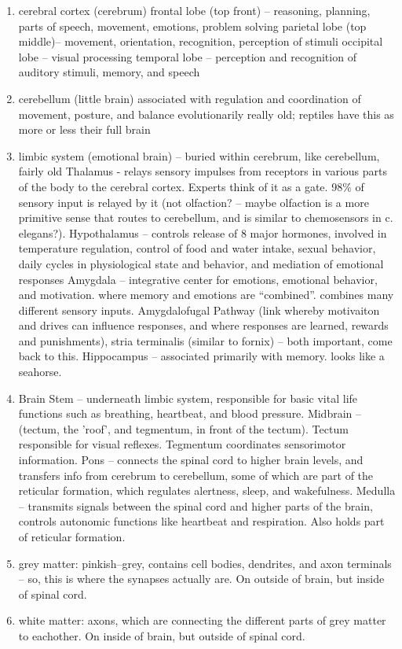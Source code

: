 \documentclass[11pt, a4paper, oneside]{article}   	%
\begin{document}
\begin{enumerate}
    \item cerebral cortex (cerebrum)
        \subitem frontal lobe (top front) -- reasoning, planning, parts of speech, movement, emotions, problem solving
        \subitem parietal lobe (top middle)-- movement,  orientation, recognition, perception of stimuli
        \subitem occipital lobe -- visual processing
        \subitem temporal lobe -- perception and recognition of auditory stimuli, memory, and speech
    \item cerebellum (little brain)
        \subitem associated with regulation and coordination of movement, posture, and balance
        \subitem evolutionarily really old; reptiles have this as more or less their full brain
    \item limbic system (emotional brain) -- buried within cerebrum, like cerebellum, fairly old
      \subitem Thalamus - relays sensory impulses from receptors in various parts of the body to the cerebral cortex. Experts think of it as a gate. 98\% of sensory input is relayed by it (not olfaction? -- maybe olfaction is a more primitive sense that routes to cerebellum, and is similar to chemosensors in c. elegans?).
      \subitem Hypothalamus  -- controls release of 8 major hormones, involved in temperature regulation, control of food and water intake,  sexual behavior,  daily cycles in physiological state and behavior, and mediation of emotional responses
      \subitem Amygdala -- integrative center for emotions, emotional behavior, and motivation.  where memory and emotions are ``combined''. combines many different sensory inputs.
        \subsubitem Amygdalofugal Pathway (link whereby motivaiton and drives can influence responses, and where responses are learned, rewards and punishments), stria terminalis (similar to fornix) -- both important, come back to this.
      \subitem Hippocampus -- associated primarily with memory. looks like a seahorse. 
    \item Brain Stem -- underneath limbic system, responsible for basic vital life functions such as breathing, heartbeat, and blood pressure.
        \subitem Midbrain -- (tectum, the 'roof', and tegmentum, in front of the tectum). Tectum responsible for visual reflexes. Tegmentum coordinates sensorimotor  information. 
        \subitem Pons -- connects the spinal cord to higher brain levels, and transfers info from cerebrum to cerebellum, some of which are part of the reticular formation, which  regulates alertness, sleep, and wakefulness.
        \subitem Medulla -- transmits signals between the spinal cord and higher parts of the brain, controls autonomic functions like heartbeat and respiration. Also holds part of reticular formation.
    \item grey matter: pinkish--grey, contains cell bodies, dendrites, and axon terminals -- so, this is where the synapses actually are. On outside of brain, but inside of spinal cord.
    \item white matter: axons, which are connecting the different parts of grey matter to eachother. On inside of brain, but outside of spinal cord.
\end{enumerate}
\end{document}
